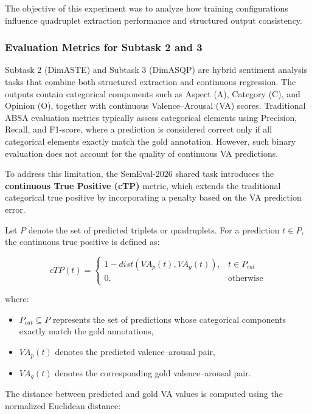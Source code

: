 \documentclass{article}
\begin{document}
The objective of this experiment was to analyze how training configurations influence quadruplet extraction performance and structured output consistency.

\subsubsection{Evaluation Metrics for Subtask 2 and 3}

Subtask 2 (DimASTE) and Subtask 3 (DimASQP) are hybrid sentiment analysis tasks that combine both structured extraction and continuous regression. The outputs contain categorical components such as Aspect (A), Category (C), and Opinion (O), together with continuous Valence–Arousal (VA) scores. Traditional ABSA evaluation metrics typically assess categorical elements using Precision, Recall, and F1-score, where a prediction is considered correct only if all categorical elements exactly match the gold annotation. However, such binary evaluation does not account for the quality of continuous VA predictions.

To address this limitation, the SemEval-2026 shared task introduces the \textbf{continuous True Positive (cTP)} metric, which extends the traditional categorical true positive by incorporating a penalty based on the VA prediction error.

Let $P$ denote the set of predicted triplets or quadruplets. For a prediction $t \in P$, the continuous true positive is defined as:

\begin{equation}
cTP(t)=
\begin{cases}
1 - dist(VA_p(t), VA_g(t)), & t \in P_{cat} \\
0, & \text{otherwise}
\end{cases}
\end{equation}

where:
\begin{itemize}
    \item $P_{cat} \subseteq P$ represents the set of predictions whose categorical components exactly match the gold annotations,
    \item $VA_p(t)$ denotes the predicted valence–arousal pair,
    \item $VA_g(t)$ denotes the corresponding gold valence–arousal pair.
\end{itemize}

The distance between predicted and gold VA values is computed using the normalized Euclidean distance:
\end{document}
